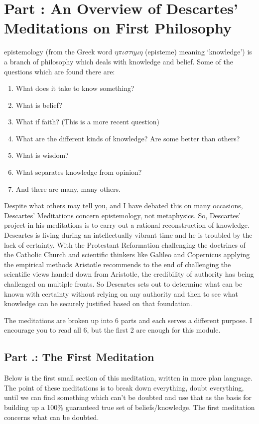 \chapter{Part \thechapcount: An Overview of Descartes' Meditations on First Philosophy}\setcounter{seccount}{1}
\Gls{epistemology} (from the Greek word $\eta\pi\iota\sigma\tau\eta\mu\eta$ (epist\-em\-e) meaning ‘knowledge’) is a branch of philosophy which deals with knowledge and belief. Some of the questions which are found there are:
\begin{enumerate}
    \item What does it take to know something?
    \item What is belief?
    \item What if faith? (This is a more recent question)
    \item What are the different kinds of knowledge? Are some better than others?
    \item What is wisdom?
    \item What separates knowledge from opinion?
    \item And there are many, many others.
\end{enumerate}
Despite what others may tell you, and I have debated this on many occasions, Descartes' Meditations concern epistemology, not metaphysics. So, Descartes' project in his meditations is to carry out a rational reconstruction of knowledge. Descartes is living during an intellectually vibrant time and he is troubled by the lack of certainty. With the Protestant Reformation challenging the doctrines of the Catholic Church and scientific thinkers like Galileo and Copernicus applying the empirical methods Aristotle recommends to the end of challenging the scientific views handed down from Aristotle, the credibility of authority has being challenged on multiple fronts. So Descartes sets out to determine what can be known with certainty without relying on any authority and then to see what knowledge can be securely justified based on that foundation.

The meditations are broken up into 6 parts and each serves a different purpose. I encourage you to read all 6, but the first 2 are enough for this module.
\section{Part \thechapcount.\theseccount: The First Meditation}
Below is the first small section of this meditation, written in more plan language. The point of these meditations is to break down everything, doubt everything, until we can find something which can’t be doubted and use that as the basis for building up a 100\% guaranteed true set of beliefs/knowledge. The first meditation concerns what can be doubted.


